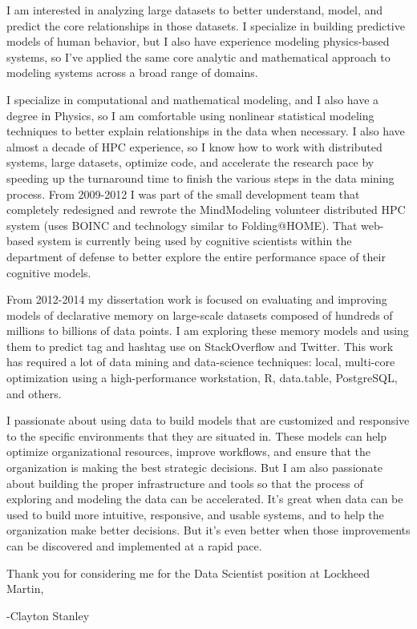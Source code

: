 \documentclass{article}
\begin{document}
I am interested in analyzing large datasets to better understand, model, and predict the core relationships in those datasets.
I specialize in building predictive models of human behavior, but I also have experience modeling physics-based systems,
so I've applied the same core analytic and mathematical approach to modeling systems across a broad range of domains.

I specialize in computational and mathematical modeling, and I also have a degree in Physics, so I am comfortable using nonlinear statistical modeling techniques to better explain relationships in the data when necessary.
I also have almost a decade of HPC experience, so I know how to work with distributed systems, large datasets, optimize code,
and accelerate the research pace by speeding up the turnaround time to finish the various steps in the data mining process. 
From 2009-2012 I was part of the small development team that completely redesigned and rewrote the MindModeling volunteer distributed HPC system (uses BOINC and technology similar to Folding@HOME).
That web-based system is currently being used by cognitive scientists within the department of defense to better explore the entire performance space of their cognitive models.

From 2012-2014 my dissertation work is focused on evaluating and improving models of declarative memory on large-scale datasets composed of hundreds of millions to billions of data points.
I am exploring these memory models and using them to predict tag and hashtag use on StackOverflow and Twitter.
This work has required a lot of data mining and data-science techniques: local, multi-core optimization using a high-performance workstation, R, data.table, PostgreSQL, and others.

I passionate about using data to build models that are customized and responsive to the specific environments that they are situated in.
These models can help optimize organizational resources, improve workflows, and ensure that the organization is making the best strategic decisions.
But I am also passionate about building the proper infrastructure and tools so that the process of exploring and modeling the data can be accelerated.
It's great when data can be used to build more intuitive, responsive, and usable systems, and to help the organization make better decisions.
But it's even better when those improvements can be discovered and implemented at a rapid pace.

Thank you for considering me for the Data Scientist position at Lockheed Martin,

-Clayton Stanley
\end{document}

